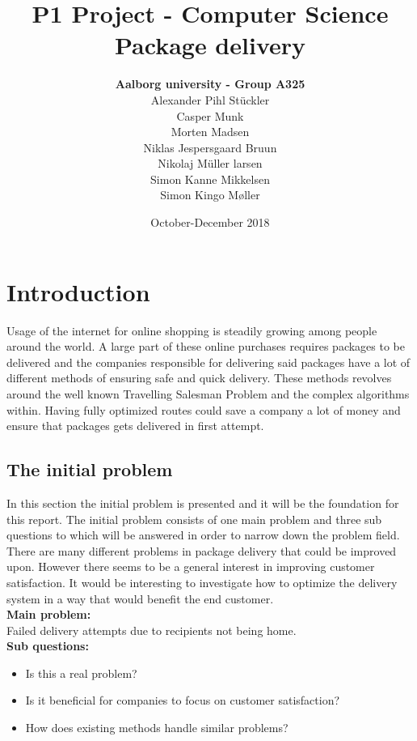 \documentclass[12pt]{report}
\title{P1 Project - Computer Science\\Package delivery}
\author{\textbf{Aalborg university - Group A325}\\Alexander Pihl Stückler\\Casper Munk\\Morten Madsen\\Niklas Jespersgaard Bruun\\Nikolaj Müller larsen\\Simon Kanne Mikkelsen\\Simon Kingo Møller}
\date{October-December 2018}
\begin{document}
\maketitle

\tableofcontents


\chapter{Introduction}
Usage of the internet for online shopping is steadily growing among people around the world\cite{FDIHyearreport}. A large part of these online purchases requires packages to be delivered and the companies responsible for delivering said packages have a lot of different methods of ensuring safe and quick delivery\cite{postnordoptions, glsoptions, upsoptions}. These methods revolves around the well known Travelling Salesman Problem and the complex algorithms within\cite{tsp}. Having fully optimized routes could save a company a lot of money and ensure that packages gets delivered in first attempt. 



\section{The initial problem}
In this section the initial problem is presented and it will be the foundation for this report. The initial problem consists of one main problem and three sub questions to which will be answered in order to narrow down the problem field. \\

There are many different problems in package delivery that could be improved upon. However there seems to be a general interest in improving customer satisfaction. It would be interesting to investigate how to optimize the delivery system in a way that would benefit the end customer.
\\

\textbf{Main problem:}\\
Failed delivery attempts due to recipients not being home. \\

\textbf{Sub questions:}
\begin{itemize}
\item Is this a real problem?
\item Is it beneficial for companies to focus on customer satisfaction?
\item How does existing methods handle similar problems?
\end{itemize}
\end{document}
